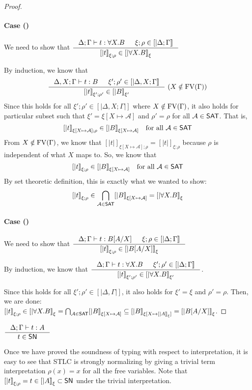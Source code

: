 \begin{proof}
\paragraph{Case ()}
We need to show that
$ \inference{\Delta;\Gamma |- t : \forall X.B & \xi;\rho\in[|\Delta;\Gamma|]}
	{[|t|]_{\xi;\rho} \in [|\forall X.B|]_\xi} $

By induction, we know that
\[ \inference{\Delta,X;\Gamma |- t : B & \xi';\rho'\in[|\Delta,X;\Gamma|]}
	{[|t|]_{\xi';\rho'} \in [|B|]_{\xi'}} ~
	(X\notin\FV(\Gamma))
\]
Since this holds for all $\xi';\rho' \in [|\Delta,X;\Gamma|]$ where
$X\notin\mathop{\mathrm{FV}}(\Gamma)$, it also holds for particular subset such that
$\xi' = \xi[X\mapsto\mathcal{A}]$ and $\rho'=\rho$ for all $\mathcal{A}\in\mathsf{SAT}$.
That is,
\[ [|t|]_{\xi[X\mapsto\mathcal{A}];\rho} \in [|B|]_{\xi[X\mapsto\mathcal{A}]}
   \quad \text{for all}~\mathcal{A}\in\mathsf{SAT} \]
From $X\notin\mathop{\mathrm{FV}}(\Gamma)$, we know that
$[|t|]_{\xi[X\mapsto\mathcal{A}];\rho} = [|t|]_{\xi;\rho}$
because $\rho$ is independent of what $X$ maps to.
So, we know that
\[ [|t|]_{\xi;\rho} \in [|B|]_{\xi[X\mapsto\mathcal{A}]}
	\quad \text{for all}~\mathcal{A}\in\mathsf{SAT} \]
By set theoretic definition, this is exactly what we wanted to show:
\[ [|t|]_{\xi;\rho} \in
	\bigcap_{\mathcal{A}\in\mathsf{SAT}} [|B|]_{\xi[X\mapsto\mathcal{A}]}
	= [|\forall X.B|]_\xi
\]

\paragraph{Case ()}
We need to show that
$ \inference{\Delta;\Gamma |- t : B[A/X] & \xi;\rho\in[|\Delta;\Gamma|]}
	{[|t|]_{\xi;\rho} \in [|B[A/X]|]_\xi} $

By induction, we know that
$ \inference{\Delta;\Gamma |- t : \forall X.B & \xi';\rho'\in[|\Delta;\Gamma|]}
	{[|t|]_{\xi';\rho'} \in [|\forall X.B|]_{\xi'}} $.

Since this holds for all $\xi';\rho' \in [|\Delta,\Gamma|]$,
it also holds for $\xi'=\xi$ and $\rho'=\rho$. Then, we are done:
$ [|t|]_{\xi;\rho} \in [|\forall X.B|]_{\xi}
	= \bigcap_{\mathcal{A}\in\mathsf{SAT}} [|B|]_{\xi[X\mapsto\mathcal{A}]}
	\subseteq [|B|]_{\xi[X\mapsto[|A|]_\xi]} = [|B[A/X]|]_\xi $.
\end{proof}

\begin{corollary}
	$\inference{\Delta;\Gamma |- t : A}{t \in \SN}$
\end{corollary}
Once we have proved the soundness of typing with respect to interpretation,
it is easy to see that STLC is strongly normalizing by giving a trivial term
interpretation $\rho(x) = x$ for all the free variables.
Note that $[|t|]_{\xi;\rho} = t \in [|A|]_\xi \subset \mathsf{SN}$
under the trivial interpretation.


